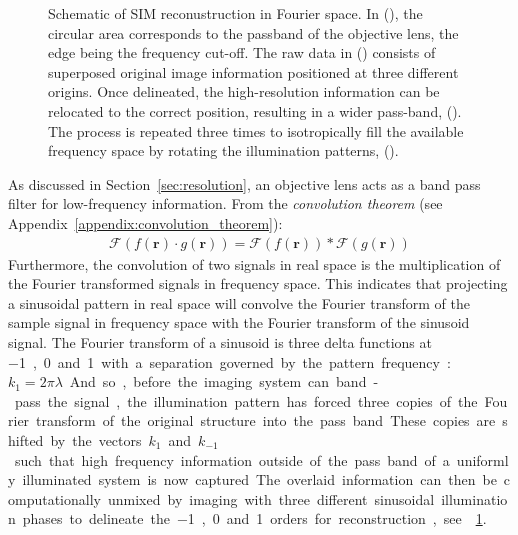 \begin{figure}
    \caption[Schematic of \gls{SIM} reconustruction in Fourier space]
        {Schematic of \gls{SIM} reconustruction in Fourier space.
        In (), the circular area corresponds to the passband of the \gls{objective lens}, the edge being the frequency cut-off.
        The raw data in () consists of superposed original image information
        positioned at three different origins.
        Once delineated, the high-resolution information can be relocated to the correct position, resulting in a wider pass-band, ().
        The process is repeated three times to isotropically fill the available frequency space by rotating the illumination patterns, ().
        }\label{fig:sim_flowers}
\end{figure}

As discussed in Section~\ref{sec:resolution}, an \gls{objective lens} acts as a band pass filter for low-frequency information.
From the \emph{\Gls{convolution theorem}} (see Appendix~\ref{appendix:convolution_theorem}):
\begin{align}
  \mathcal{F} (f(\mathbf{r}) \cdot g(\mathbf{r})) = \mathcal{F}(f(\mathbf{r})) * \mathcal{F}(g(\mathbf{r}))
\end{align}
Furthermore, the convolution of two signals in real space is the multiplication of the Fourier transformed signals in frequency space.
This indicates that projecting a sinusoidal pattern in real space will convolve the Fourier transform of the sample signal in frequency space with the Fourier transform of the sinusoid signal.
The Fourier transform of a sinusoid is three delta functions at \SI{-1}, \SI{0} and \SI{+1} with a separation governed by the pattern frequency: \(k_1 = {2\pi}{\lambda} \).
And so, before the imaging system can band-pass the signal, the illumination pattern has forced three copies of the Fourier transform of the original structure into the pass band.
These copies are shifted by the vectors \(k_1 \) and \(k_{-1} \) such that high frequency information outside of the pass band of a uniformly illuminated system is now captured. %
The overlaid information can then be computationally unmixed by imaging with three different sinusoidal illumination phases to delineate the \SI{-1}{}, \SI{0}{} and \SI{+1}{} orders for reconstruction, see \figurename~\ref{fig:sim_flowers}.

